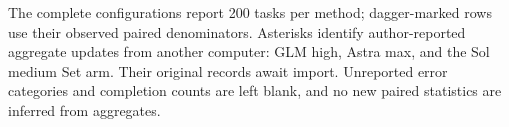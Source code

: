 The complete configurations report 200 tasks per method; dagger-marked rows use their observed paired denominators. Asterisks identify author-reported aggregate updates from another computer: GLM high, Astra max, and the Sol medium Set arm. Their original records await import. Unreported error categories and completion counts are left blank, and no new paired statistics are inferred from aggregates.
